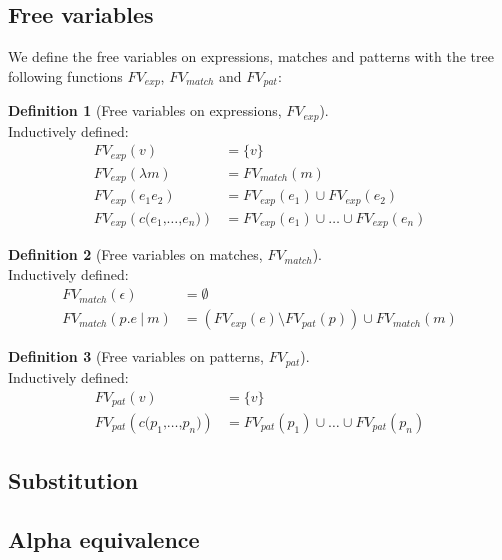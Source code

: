 \documentclass[a4paper, oneside, draft]{memoir}
\theoremstyle{definition}
\newtheorem{definition}{Definition}
\newcommand{\ttt}[1]{\texttt{#1}}
\begin{document}
\subsection{Free variables}

We define the free variables on expressions, matches and patterns with the tree
following functions $FV_{exp}$, $FV_{match}$ and $FV_{pat}$:


\begin{definition}[Free variables on expressions, $FV_{exp}$] \ \\
  Inductively defined:
  \begin{eqnarray}[rl]
    FV_{exp} (v) &= \{v\} \\
    FV_{exp} (\lambda m) &= FV_{match} (m) \\
    FV_{exp} (e_1e_2) &= FV_{exp} (e_1) \cup FV_{exp} (e_2) \\
    FV_{exp} (c\ttt{(}e_1\ttt{,} \ldots \ttt{,} e_n \ttt{)}) &= FV_{exp}
    (e_1) \cup \ldots \cup FV_{exp} (e_n)
  \end{eqnarray}
\end{definition}

\begin{definition}[Free variables on matches, $FV_{match}$]\ \\ 
  Inductively defined:
  \begin{eqnarray}[rl]
    FV_{match} (\epsilon) &= \emptyset \\
    FV_{match} (p\ttt{.}e\ \ttt{|}\ m) &= \left( FV_{exp}(e) \setminus
      FV_{pat}(p) \right) \cup FV_{match} (m)
  \end{eqnarray}
\end{definition}

\begin{definition}[Free variables on patterns, $FV_{pat}$] \ \\
  Inductively defined:
  \begin{eqnarray}[rl]
    FV_{pat} (v) &= \{v\} \\
    FV_{pat} (c\ttt{(}p_1\ttt{,} \ldots \ttt{,} p_n\ttt{)}) &= FV_{pat} (p_1)
    \cup \ldots \cup FV_{pat} (p_n)
  \end{eqnarray}
\end{definition}

\subsection{Substitution}



\subsection{Alpha equivalence}
\end{document}
